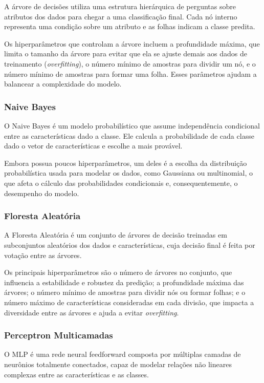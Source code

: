A árvore de decisões utiliza uma estrutura hierárquica de perguntas sobre atributos dos dados para chegar a uma classificação final. Cada nó interno representa uma condição sobre um atributo e as folhas indicam a classe predita.

Os hiperparâmetros que controlam a árvore incluem a profundidade máxima, que limita o tamanho da árvore para evitar que ela se ajuste demais aos dados de treinamento (\textit{overfitting}), o número mínimo de amostras para dividir um nó, e o número mínimo de amostras para formar uma folha. Esses parâmetros ajudam a balancear a complexidade do modelo.

\subsubsection{Naive Bayes}

O Naive Bayes é um modelo probabilístico que assume independência condicional entre as características dado a classe. Ele calcula a probabilidade de cada classe dado o vetor de características e escolhe a mais provável.

Embora possua poucos hiperparâmetros, um deles é a escolha da distribuição probabilística usada para modelar os dados, como Gaussiana ou multinomial, o que afeta o cálculo das probabilidades condicionais e, consequentemente, o desempenho do modelo.

\subsubsection{Floresta Aleatória}

A Floresta Aleatória é um conjunto de árvores de decisão treinadas em subconjuntos aleatórios dos dados e características, cuja decisão final é feita por votação entre as árvores.

Os principais hiperparâmetros são o número de árvores no conjunto, que influencia a estabilidade e robustez da predição; a profundidade máxima das árvores; o número mínimo de amostras para dividir nós ou formar folhas; e o número máximo de características consideradas em cada divisão, que impacta a diversidade entre as árvores e ajuda a evitar \textit{overfitting}.

\subsubsection{Perceptron Multicamadas}

O MLP é uma rede neural feedforward composta por múltiplas camadas de neurônios totalmente conectados, capaz de modelar relações não lineares complexas entre as características e as classes.

